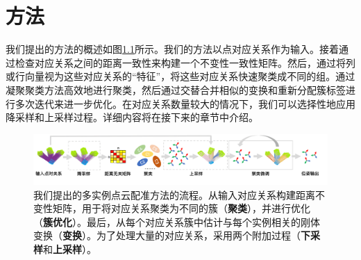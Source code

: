 %
%
%
%
%
%


\chapter{方法}

我们提出的方法的概述如图\ref{fig:pipeline}所示。我们的方法以点对应关系作为输入。接着通过检查对应关系之间的距离一致性来构建一个不变性一致性矩阵。然后，通过将列或行向量视为这些对应关系的“特征”，将这些对应关系快速聚类成不同的组。通过凝聚聚类方法高效地进行聚类，然后通过交替合并相似的变换和重新分配簇标签进行多次迭代来进一步优化。在对应关系数量较大的情况下，我们可以选择性地应用降采样和上采样过程。详细内容将在接下来的章节中介绍。

\begin{figure}[ht]
    \centering
    \includegraphics[width=1\textwidth]{images/pipeline.png} %
    \caption{我们提出的多实例点云配准方法的流程。从输入对应关系构建距离不变性矩阵，用于将对应关系聚类为不同的簇（\textbf{聚类}），并进行优化（\textbf{簇优化}）。最后，从每个对应关系簇中估计与每个实例相关的刚体变换（\textbf{变换}）。为了处理大量的对应关系，采用两个附加过程（\textbf{下采样}和\textbf{上采样}）。}
    \label{fig:pipeline}
    \vspace{-0.6in}
\end{figure}

